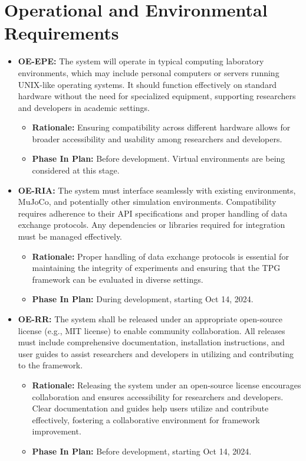 \documentclass[12pt]{article}
\begin{document}
\section{Operational and Environmental Requirements}
\begin{itemize}
\item \label{OE-EPE} \textbf{OE-EPE:} The system will operate in typical computing laboratory environments, which may include personal computers or servers running UNIX-like operating systems. It should function effectively on standard hardware without the need for specialized equipment, supporting researchers and developers in academic settings.
  \begin{itemize}
    \item \textbf{Rationale:} Ensuring compatibility across different hardware allows for broader accessibility and usability among researchers and developers.
    \item \textbf{Phase In Plan:} Before development. Virtual environments are being considered at this stage.
  \end{itemize}

\item \label{OE-RIA} \textbf{OE-RIA:} The system must interface seamlessly with existing environments, MuJoCo, and potentially other simulation environments. Compatibility requires adherence to their API specifications and proper handling of data exchange protocols. Any dependencies or libraries required for integration must be managed effectively.
  \begin{itemize}
    \item \textbf{Rationale:} Proper handling of data exchange protocols is essential for maintaining the integrity of experiments and ensuring that the TPG framework can be evaluated in diverse settings.
    \item \textbf{Phase In Plan:} During development, starting Oct 14, 2024.
  \end{itemize}

\item \label{OE-RR} \textbf{OE-RR:} The system shall be released under an appropriate open-source license (e.g., MIT license) to enable community collaboration. All releases must include comprehensive documentation, installation instructions, and user guides to assist researchers and developers in utilizing and contributing to the framework.
  \begin{itemize}
    \item \textbf{Rationale:} Releasing the system under an open-source license encourages collaboration and ensures accessibility for researchers and developers. Clear documentation and guides help users utilize and contribute effectively, fostering a collaborative environment for framework improvement.
    \item \textbf{Phase In Plan:} Before development, starting Oct 14, 2024.
  \end{itemize}


\end{itemize}
\end{document}

